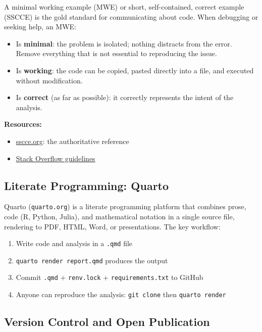 A minimal working example (MWE) or
short, self-contained, correct example (SSCCE) is the gold standard for
communicating about code. When debugging or seeking help, an MWE:

\begin{itemize}
  \item Is \textbf{minimal}: the problem is isolated; nothing distracts from
    the error. Remove everything that is not essential to reproducing the issue.
  \item Is \textbf{working}: the code can be copied, pasted directly into a
    file, and executed without modification.
  \item Is \textbf{correct} (as far as possible): it correctly represents
    the intent of the analysis.
\end{itemize}

\noindent\textbf{Resources:}
\begin{itemize}
  \item \href{http://www.sscce.org}{sscce.org}: the authoritative reference
  \item \href{https://stackoverflow.com/help/minimal-reproducible-example}{%
    Stack Overflow guidelines}
\end{itemize}

\subsection{Literate Programming: Quarto}

Quarto (\texttt{quarto.org}) is a literate programming platform that
combines prose, code (R, Python, Julia), and mathematical notation in a
single source file, rendering to PDF, HTML, Word, or presentations. The
key workflow:

\begin{enumerate}
  \item Write code and analysis in a \texttt{.qmd} file
  \item \texttt{quarto render report.qmd} produces the output
  \item Commit \texttt{.qmd} + \texttt{renv.lock} + \texttt{requirements.txt}
    to GitHub
  \item Anyone can reproduce the analysis: \texttt{git clone} then
    \texttt{quarto render}
\end{enumerate}

\subsection{Version Control and Open Publication}

